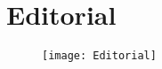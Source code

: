 
\section{Editorial}
\begin{figure}[h]
\centering
\centerline{\texttt{[image: Editorial]} }
\end{figure}

